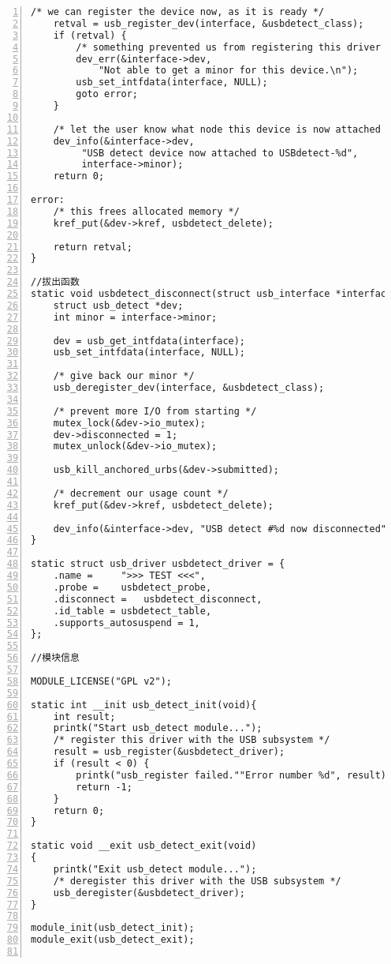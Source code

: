 \documentclass{article}
\begin{document}
\begin{enumerate}
\begin{lstlisting}[numbers=left]
	/* we can register the device now, as it is ready */
	retval = usb_register_dev(interface, &usbdetect_class);
	if (retval) {
		/* something prevented us from registering this driver */
		dev_err(&interface->dev,
			"Not able to get a minor for this device.\n");
		usb_set_intfdata(interface, NULL);
		goto error;
	}

	/* let the user know what node this device is now attached to */
	dev_info(&interface->dev,
		 "USB detect device now attached to USBdetect-%d",
		 interface->minor);
	return 0;

error:
	/* this frees allocated memory */
	kref_put(&dev->kref, usbdetect_delete);

	return retval;
}

//拔出函数
static void usbdetect_disconnect(struct usb_interface *interface){
	struct usb_detect *dev;
	int minor = interface->minor;

	dev = usb_get_intfdata(interface);
	usb_set_intfdata(interface, NULL);

	/* give back our minor */
	usb_deregister_dev(interface, &usbdetect_class);

	/* prevent more I/O from starting */
	mutex_lock(&dev->io_mutex);
	dev->disconnected = 1;
	mutex_unlock(&dev->io_mutex);

	usb_kill_anchored_urbs(&dev->submitted);

	/* decrement our usage count */
	kref_put(&dev->kref, usbdetect_delete);

	dev_info(&interface->dev, "USB detect #%d now disconnected", minor);
}

static struct usb_driver usbdetect_driver = {
	.name =		">>> TEST <<<",
	.probe =	usbdetect_probe,
	.disconnect =	usbdetect_disconnect,
	.id_table =	usbdetect_table,
	.supports_autosuspend = 1,
};

//模块信息

MODULE_LICENSE("GPL v2");

static int __init usb_detect_init(void){
	int result;
	printk("Start usb_detect module...");
	/* register this driver with the USB subsystem */
	result = usb_register(&usbdetect_driver);
	if (result < 0) {
		printk("usb_register failed.""Error number %d", result);
		return -1;
	}
	return 0;
}

static void __exit usb_detect_exit(void)
{
	printk("Exit usb_detect module...");
	/* deregister this driver with the USB subsystem */
	usb_deregister(&usbdetect_driver);
}

module_init(usb_detect_init);
module_exit(usb_detect_exit);


\end{lstlisting}
\end{enumerate}
\end{document}
